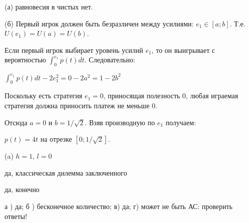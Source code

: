 \begin{solution}{4.51}

(а) равновесия в чистых нет. \par
(б) Первый игрок должен быть безразличен между усилиями:
$e_{1}\in [a;b]$. Т.е. $U(e_{1})=U(a)=U(b)$. \par
Если первый игрок выбирает уровень усилий $e_{1}$, то он
выигрывает с вероятностью $\int_{0}^{e_{1}}p(t)dt$.
Следовательно: \par
$\int_{0}^{e_{1}}p(t)dt-2e_{1}^{2}=0-2a^{2}=1-2b^{2}$ \par
Поскольку есть стратегия $e_{1}=0$, приносящая полезность 0, любая
играемая стратегия должна приносить платеж не меньше 0. \par
Отсюда $a=0$ и $b=1/\sqrt{2}$.
Взяв производную по $e_{1}$ получаем: \par
$p(t)=4t$ на отрезке $[0;1/\sqrt{2}]$.
\end{solution}
\begin{solution}{4.52}
(a) $h=1$, $l=0$
\end{solution}
\begin{solution}{4.53}

\end{solution}
\begin{solution}{4.54}

\end{solution}
\begin{solution}{4.55}

\end{solution}
\begin{solution}{4.56}

\end{solution}
\begin{solution}{4.57}

\end{solution}
\begin{solution}{4.58}

\end{solution}
\begin{solution}{4.59}

\end{solution}
\begin{solution}{4.60}
да, классическая дилемма заключенного
\end{solution}
\begin{solution}{4.61}
 да, конечно
\end{solution}
\begin{solution}{4.62}
а ) да; б ) бесконечное количество; в) да; г) может не быть
{\red АС: проверить ответы!}
\end{solution}
